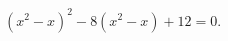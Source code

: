 \begin{ex}[type=equation]
	\begin{condition}
		$\left(x^2 - x\right)^2 - 8\left(x^2 - x\right) + 12 = 0.$
	\end{condition}
\end{ex}